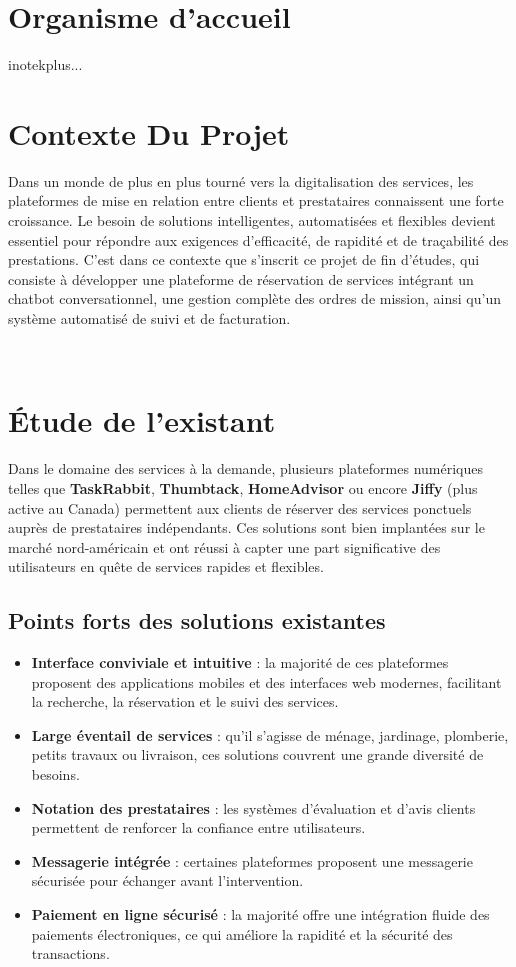 \section{Organisme d’accueil}

inotekplus...


\section{Contexte Du Projet} 
Dans un monde de plus en plus tourné vers la digitalisation des services, les plateformes de mise en relation entre clients et prestataires connaissent une forte croissance. Le besoin de solutions intelligentes, automatisées et flexibles devient essentiel pour répondre aux exigences d’efficacité, de rapidité et de traçabilité des prestations. C’est dans ce contexte que s’inscrit ce projet de fin d’études, qui consiste à développer une plateforme de réservation de services intégrant un chatbot conversationnel, une gestion complète des ordres de mission, ainsi qu’un système automatisé de suivi et de facturation.


\\
\section{Étude de l’existant}

Dans le domaine des services à la demande, plusieurs plateformes numériques telles que \textbf{TaskRabbit}, \textbf{Thumbtack}, \textbf{HomeAdvisor} ou encore \textbf{Jiffy} (plus active au Canada) permettent aux clients de réserver des services ponctuels auprès de prestataires indépendants. Ces solutions sont bien implantées sur le marché nord-américain et ont réussi à capter une part significative des utilisateurs en quête de services rapides et flexibles.

\subsection*{Points forts des solutions existantes}
\begin{itemize}
  \item \textbf{Interface conviviale et intuitive} : la majorité de ces plateformes proposent des applications mobiles et des interfaces web modernes, facilitant la recherche, la réservation et le suivi des services.
  \item \textbf{Large éventail de services} : qu’il s’agisse de ménage, jardinage, plomberie, petits travaux ou livraison, ces solutions couvrent une grande diversité de besoins.
  \item \textbf{Notation des prestataires} : les systèmes d’évaluation et d’avis clients permettent de renforcer la confiance entre utilisateurs.
  \item \textbf{Messagerie intégrée} : certaines plateformes proposent une messagerie sécurisée pour échanger avant l’intervention.
  \item \textbf{Paiement en ligne sécurisé} : la majorité offre une intégration fluide des paiements électroniques, ce qui améliore la rapidité et la sécurité des transactions.
\end{itemize}

